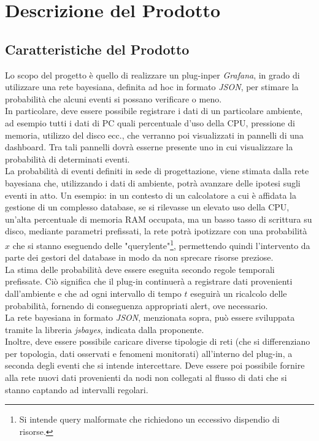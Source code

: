 \section{Descrizione del Prodotto}\label{DescrizioneProdotto}

\subsection{Caratteristiche del Prodotto}\label{CaratteristicheProdotto}
Lo scopo del progetto è quello di realizzare un plug-in\glossario per \textit{Grafana}\glossario, in grado di utilizzare una rete bayesiana\glossario, definita ad hoc in formato \textit{JSON}\glossario, per stimare la probabilità che alcuni eventi si possano verificare o meno.\\
In particolare, deve essere possibile registrare i dati di un particolare ambiente, ad esempio tutti i dati di PC quali percentuale d'uso della CPU, pressione di memoria, utilizzo del disco ecc., che verranno poi visualizzati in pannelli di una dashboard\glossario. Tra tali pannelli dovrà esserne presente uno in cui visualizzare la probabilità di determinati eventi.\\
La probabilità di eventi definiti in sede di progettazione, viene stimata dalla rete bayesiana che, utilizzando i dati di ambiente, potrà avanzare delle ipotesi sugli eventi in atto. Un esempio: in un contesto di un calcolatore a cui è affidata la gestione di un complesso database\glossario, se si rilevasse un elevato uso della CPU, un'alta percentuale di memoria RAM occupata, ma un basso tasso di scrittura su disco, mediante parametri prefissati, la rete potrà ipotizzare con una probabilità $x$ che si stanno eseguendo delle "query\glossario lente"\footnote{Si intende query malformate che richiedono un eccessivo dispendio di risorse.}, permettendo quindi l'intervento da parte dei gestori del database in modo da non sprecare risorse preziose.\\
La stima delle probabilità deve essere eseguita secondo regole temporali prefissate. Ciò significa che il plug-in continuerà a registrare dati provenienti dall'ambiente e che ad ogni intervallo di tempo $t$ eseguirà un ricalcolo delle probabilità, fornendo di conseguenza appropriati alert, ove necessario.\\
La rete bayesiana in formato \textit{JSON}, menzionata sopra, può essere sviluppata tramite la libreria \textit{jsbayes}\glossario, indicata dalla proponente.\\
Inoltre, deve essere possibile caricare diverse tipologie di reti (che si differenziano per topologia, dati osservati e fenomeni monitorati) all'interno del plug-in, a seconda degli eventi che si intende intercettare. Deve essere poi possibile fornire alla rete nuovi dati provenienti da nodi non collegati al flusso di dati che si stanno captando ad intervalli regolari.

